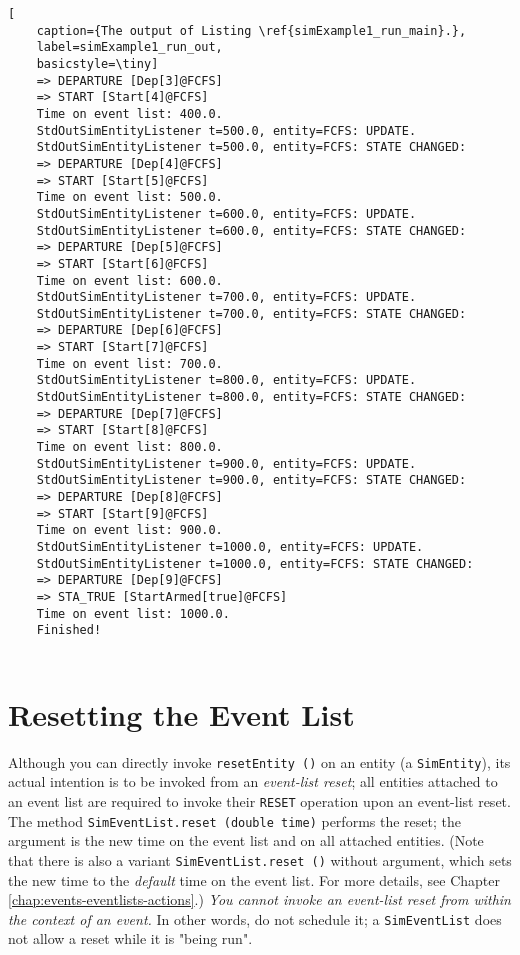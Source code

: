 \begin{lstfloat}
\begin{lstlisting}[
	caption={The output of Listing \ref{simExample1_run_main}.},
	label=simExample1_run_out,
	basicstyle=\tiny]
	=> DEPARTURE [Dep[3]@FCFS]
	=> START [Start[4]@FCFS]
	Time on event list: 400.0.
	StdOutSimEntityListener t=500.0, entity=FCFS: UPDATE.
	StdOutSimEntityListener t=500.0, entity=FCFS: STATE CHANGED:
	=> DEPARTURE [Dep[4]@FCFS]
	=> START [Start[5]@FCFS]
	Time on event list: 500.0.
	StdOutSimEntityListener t=600.0, entity=FCFS: UPDATE.
	StdOutSimEntityListener t=600.0, entity=FCFS: STATE CHANGED:
	=> DEPARTURE [Dep[5]@FCFS]
	=> START [Start[6]@FCFS]
	Time on event list: 600.0.
	StdOutSimEntityListener t=700.0, entity=FCFS: UPDATE.
	StdOutSimEntityListener t=700.0, entity=FCFS: STATE CHANGED:
	=> DEPARTURE [Dep[6]@FCFS]
	=> START [Start[7]@FCFS]
	Time on event list: 700.0.
	StdOutSimEntityListener t=800.0, entity=FCFS: UPDATE.
	StdOutSimEntityListener t=800.0, entity=FCFS: STATE CHANGED:
	=> DEPARTURE [Dep[7]@FCFS]
	=> START [Start[8]@FCFS]
	Time on event list: 800.0.
	StdOutSimEntityListener t=900.0, entity=FCFS: UPDATE.
	StdOutSimEntityListener t=900.0, entity=FCFS: STATE CHANGED:
	=> DEPARTURE [Dep[8]@FCFS]
	=> START [Start[9]@FCFS]
	Time on event list: 900.0.
	StdOutSimEntityListener t=1000.0, entity=FCFS: UPDATE.
	StdOutSimEntityListener t=1000.0, entity=FCFS: STATE CHANGED:
	=> DEPARTURE [Dep[9]@FCFS]
	=> STA_TRUE [StartArmed[true]@FCFS]
	Time on event list: 1000.0.
	Finished!
	
	\end{lstlisting}
\end{lstfloat}

\section{Resetting the Event List}

Although you can directly invoke \lstinline|resetEntity ()| on an entity
(a \lstinline|SimEntity|),
its actual intention is to be invoked from an {\em event-list reset\/};
all entities attached to an event list are required
to invoke their \lstinline|RESET| operation upon an event-list reset.
The method \lstinline|SimEventList.reset (double time)| performs
the reset; the argument is the new time on the event list
and on all attached entities.
(Note that there is also a variant \lstinline|SimEventList.reset ()|
without argument, which sets the new time to the {\em default\/} time on the
event list. For more details, see Chapter \ref{chap:events-eventlists-actions}.)
{\em You cannot invoke an event-list reset from within the context of an event.}
In other words, do not schedule it;
a \lstinline|SimEventList| does not allow a reset
while it is "being run".

